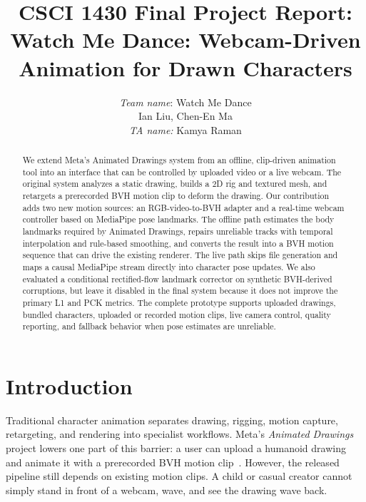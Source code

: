 \documentclass[10pt,twocolumn,letterpaper]{article}
\begin{document}
\title{CSCI 1430 Final Project Report:\\Watch Me Dance: Webcam-Driven Animation for Drawn Characters}

\author{
    \emph{Team name}: Watch Me Dance\\
    Ian Liu, Chen-En Ma\\
    \emph{TA name:} Kamya Raman
}

\maketitle
\thispagestyle{plain}

\begin{abstract}
We extend Meta's Animated Drawings system from an offline, clip-driven animation tool into an interface that can be controlled by uploaded video or a live webcam. The original system analyzes a static drawing, builds a 2D rig and textured mesh, and retargets a prerecorded BVH motion clip to deform the drawing. Our contribution adds two new motion sources: an RGB-video-to-BVH adapter and a real-time webcam controller based on MediaPipe pose landmarks. The offline path estimates the body landmarks required by Animated Drawings, repairs unreliable tracks with temporal interpolation and rule-based smoothing, and converts the result into a BVH motion sequence that can drive the existing renderer. The live path skips file generation and maps a causal MediaPipe stream directly into character pose updates. We also evaluated a conditional rectified-flow landmark corrector on synthetic BVH-derived corruptions, but leave it disabled in the final system because it does not improve the primary L1 and PCK metrics. The complete prototype supports uploaded drawings, bundled characters, uploaded or recorded motion clips, live camera control, quality reporting, and fallback behavior when pose estimates are unreliable.
\end{abstract}

\section{Introduction}

Traditional character animation separates drawing, rigging, motion capture, retargeting, and rendering into specialist workflows. Meta's \emph{Animated Drawings} project lowers one part of this barrier: a user can upload a humanoid drawing and animate it with a prerecorded BVH motion clip~\cite{Smith2023AnimatedDrawings}. However, the released pipeline still depends on existing motion clips. A child or casual creator cannot simply stand in front of a webcam, wave, and see the drawing wave back.
\end{document}
